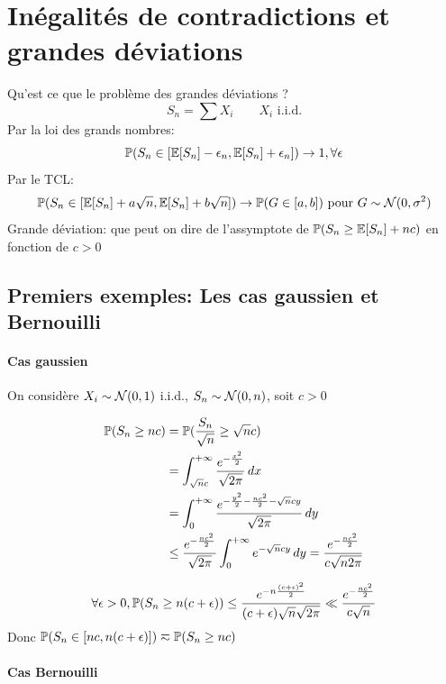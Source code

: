\documentclass[]{report}
\begin{document}
    \chapter{Inégalités de contradictions et grandes déviations}

    Qu'est ce que le problème des grandes déviations ?
    \[S_n=\sum X_i\qquad X_i \text{ i.i.d.}\]
    Par la loi des grands nombres:
    \[\mathbb{P}(S_n\in [\mathbb{E}[S_n]-\epsilon_n,\mathbb{E}[S_n]+\epsilon_n])\to 1,\forall \epsilon\]
    Par le TCL:
    \[\mathbb{P}(S_n\in [\mathbb{E}[S_n]+a\sqrt{n},\mathbb{E}[S_n]+b\sqrt{n}])\to \mathbb{P}(G\in [a,b])\text{ pour }G\sim \mathcal{N}(0,\sigma^2)\]
    Grande déviation: que peut on dire de l'assymptote de $\mathbb{P}(S_n\ge \mathbb{E}[S_n]+nc)$ en fonction de $c>0$

    \section{Premiers exemples: Les cas gaussien et Bernouilli}

    \subsubsection*{Cas gaussien}

    On considère $X_i \sim \mathcal{N}(0,1)$ i.i.d., $S_n\sim \mathcal{N}(0,n)$, soit $c>0$

    \begin{align*}
        \mathbb{P}(S_n\ge nc)&=\mathbb{P}(\frac{S_n}{\sqrt{n}}\ge \sqrt{n}c)\\
        &=\int_{\sqrt{n}c}^{+\infty} \frac{e^{-\frac{x^2}{2}}}{\sqrt{2\pi}}\, dx\\
        &=\int_{0}^{+\infty} \frac{e^{-\frac{y^2}{2}-\frac{nc^2}{2}-\sqrt{n}c y}}{\sqrt{2\pi}}\, dy\\
        &\le \frac{e^{-\frac{nc^2}{2}}}{\sqrt{2\pi}}\int_{0}^{+\infty} e^{-\sqrt{n}cy}\, dy=\frac{e^{-\frac{nc^2}{2}}}{c\sqrt{n2\pi}}
    \end{align*}

    \begin{re}{}{}
        \[\forall \epsilon>0,\mathbb{P}(S_n\ge n(c+\epsilon))\le \frac{e^{-n\frac{(c+\epsilon)^2}{2}}}{(c+\epsilon)\sqrt{n}\sqrt{2\pi}}\ll\frac{e^{-\frac{nc^2}{2}}}{c\sqrt{n}}\]
        Donc $\mathbb{P}(S_n\in [nc,n(c+\epsilon)])\eqsim \mathbb{P}(S_n\ge nc)$
    \end{re}

    \subsubsection*{Cas Bernouilli}
\end{document}
